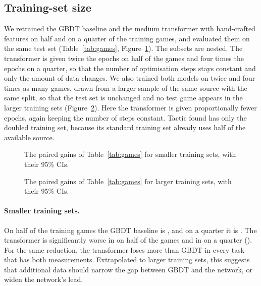 \documentclass[11pt]{article}
\begin{document}
\subsection{Training-set size}
\label{sec:games}

We retrained the GBDT baseline and the medium transformer with hand-crafted
features on half and on a quarter of the training games, and evaluated them
on the same test set (Table~\ref{tab:games}, Figure~\ref{fig:games}). The
subsets are nested. The transformer is given twice the epochs on half of the
games and four times the epochs on a quarter, so that the number of
optimisation steps stays constant and only the amount of data changes. We
also trained both models on twice and four times as many games, drawn from a
larger sample of the same source with the same split, so that the test set
is unchanged and no test game appears in the larger training sets
(Figure~\ref{fig:games-more}). Here the transformer is given proportionally
fewer epochs, again keeping the number of steps constant. Tactic found has
only the doubled training set, because its standard training set already
uses half of the available source.

\begin{table}[htbp]\centering\small
{}
\caption{Training-set size: paired gain of a model trained on a quarter,
half, twice or four times the standard number of training games over the
same model trained on the standard training set, in points of normalised
score. A negative value means the model is worse than with the standard
training set, and bold marks a statistically significant difference.}
\label{tab:games}
\end{table}

\begin{figure}[htbp]\centering
{}
\caption{The paired gains of Table~\ref{tab:games} for smaller training
sets, with their 95\% CIs.}
\label{fig:games}
\end{figure}

\begin{figure}[htbp]\centering
{}
\caption{The paired gains of Table~\ref{tab:games} for larger training
sets, with their 95\% CIs.}
\label{fig:games-more}
\end{figure}

\paragraph{Smaller training sets.}
On half of the training games the GBDT baseline is
, and on a quarter it is
. The transformer is significantly worse
in  on half of the games
and in  on a quarter
(). For the same
reduction, the transformer loses more than GBDT in every task that has both
measurements. Extrapolated to larger training sets, this suggests that
additional data should narrow the gap between GBDT and the network, or widen
the network's lead.
\end{document}
